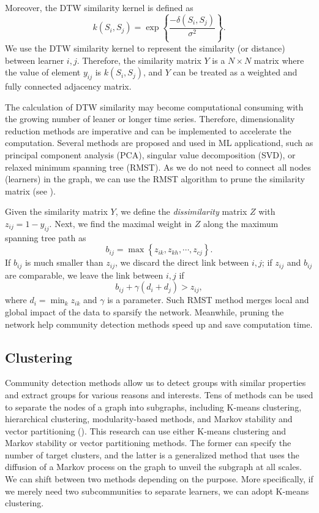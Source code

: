 \documentclass[a4paper]{article}
\theoremstyle{plain}
\begin{document}
Moreover, the DTW similarity kernel is defined as
\[
    k\left(S_i, S_j\right) = \exp\left\{\frac{-\delta(S_i,S_j)}{\sigma^2}\right\}.
\]
We use the DTW similarity kernel to represent the similarity (or distance) between
learner $i,j$. Therefore, the similarity matrix $Y$ is a $N\times N$ matrix where the value of element
$y_{ij}$ is $k(S_i, S_j)$, and $Y$ can be treated as a weighted and fully connected adjacency matrix.

The calculation of DTW similarity may become computational consuming with the
growing number of leaner or longer time series.
Therefore, dimensionality reduction methods
are imperative and can be implemented to accelerate the computation. 
Several methods are proposed and used in ML applicationd, such as principal component analysis (PCA),
singular value decomposition (SVD), or relaxed minimum spanning tree (RMST).
As we do not need to connect all nodes (learners) in the graph, we can use
the RMST algorithm to prune the similarity matrix (see \citet{rmst}).

Given the similarity matrix $Y$, we define the {\it dissimilarity} matrix $Z$ with
$z_{ij}=1-y_{ij}$. Next, we find the maximal weight in $Z$ along the maximum spanning tree
path as
\[
    b_{ij} = \max\left\{z_{ik},z_{kh},\cdots,z_{cj}\right\}.
\]
If $b_{ij}$ is much smaller than $z_{ij}$, we discard the direct link between $i,j$;
if $z_{ij}$ and $b_{ij}$ are comparable, we leave the link between $i,j$ if
\[
    b_{ij}+\gamma(d_i+d_j) > z_{ij},
\]
where $d_i=\min_k z_{ik}$ and $\gamma$ is a parameter. Such RMST method merges
local and global impact of the data to sparsify the network.
Meanwhile, pruning the network help community detection methods speed up and 
save computation time.

\subsection{Clustering}
Community detection methods allow us to detect groups with similar properties 
and extract groups for various reasons and interests. Tens of methods can be used to 
separate the nodes of a graph into subgraphs, including K-means clustering, 
hierarchical clustering, modularity-based methods, and Markov stability and vector partitioning
(\citet{ms}). This research can use either K-means clustering and Markov stability or vector partitioning
methods. The former can specify the number of target clusters,
and the latter is a generalized method that
uses the diffusion of a Markov process on the graph to unveil the subgraph
at all scales. We can shift between two methods depending on the purpose. More specifically,
if we merely need two subcommunities to separate learners, we can adopt K-means clustering.
\end{document}

